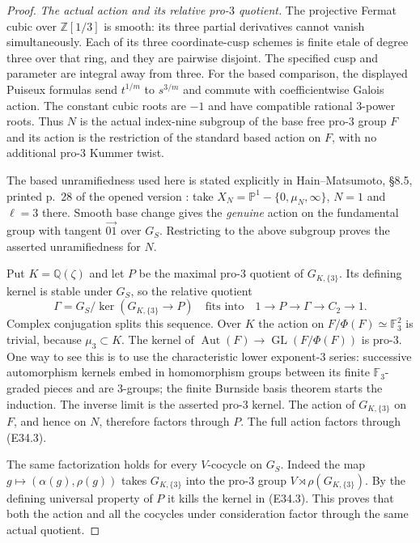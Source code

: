 \begin{proof}
\emph{The actual action and its relative pro-$3$ quotient.}
The projective Fermat cubic over $\mathbb Z[1/3]$ is smooth:
its three partial derivatives cannot vanish simultaneously.
Each of its three coordinate-cusp schemes is finite etale of
degree three over that ring, and they are pairwise disjoint.
The specified cusp and parameter are integral away from three.
For the based comparison, the displayed Puiseux formulas send
$t^{1/m}$ to $s^{3/m}$ and commute with coefficientwise
Galois action. The constant cubic roots are $-1$ and have
compatible rational $3$-power roots. Thus $N$ is the actual
index-nine subgroup of the base free pro-$3$ group $F$ and
its action is the restriction of the standard based action
on $F$, with no additional pro-$3$ Kummer twist.

The based unramifiedness used here is stated explicitly in
Hain--Matsumoto, \S8.5, printed p.~28 of the opened version
\cite{E_HainMatsumoto}: take $X_N=\mathbb P^1-\{0,\mu_N,\infty\}$,
$N=1$ and $\ell=3$ there. Smooth base change gives the
\emph{genuine} action on the fundamental group with tangent
$\overrightarrow{01}$ over $G_S$. Restricting to the above
subgroup proves the asserted unramifiedness for $N$.

Put $K=\mathbb Q(\zeta)$ and let $P$ be the maximal pro-$3$
quotient of $G_{K,\{3\}}$. Its defining kernel is stable under
$G_S$, so the relative quotient
\[
 \Gamma=G_S/\ker(G_{K,\{3\}}\longrightarrow P)
 \quad\text{fits into}\quad
 1\longrightarrow P\longrightarrow\Gamma
       \longrightarrow C_2\longrightarrow1 .
 \tag{E34.3}
\]
Complex conjugation splits this sequence.
Over $K$ the action on $F/\Phi(F)\simeq\mathbb F_3^2$ is
trivial, because $\mu_3\subset K$.
The kernel of
$\operatorname{Aut}(F)\to\operatorname{GL}(F/\Phi(F))$
is pro-$3$. One way to see this is to use the characteristic
lower exponent-$3$ series: successive automorphism kernels
embed in homomorphism groups between its finite
$\mathbb F_3$-graded pieces and are $3$-groups; the finite
Burnside basis theorem starts the induction.
The inverse limit is the asserted pro-$3$ kernel.
The action of $G_{K,\{3\}}$ on $F$, and hence on $N$, therefore
factors through $P$. The full action factors through (E34.3).

The same factorization holds for every $V$-cocycle on $G_S$.
Indeed the map $g\mapsto(\alpha(g),\rho(g))$ takes
$G_{K,\{3\}}$ into the pro-$3$ group
$V\rtimes\rho(G_{K,\{3\}})$. By the defining universal property
of $P$ it kills the kernel in (E34.3).
This proves that both the action and all the cocycles under
consideration factor through the same actual quotient.


\end{proof}
